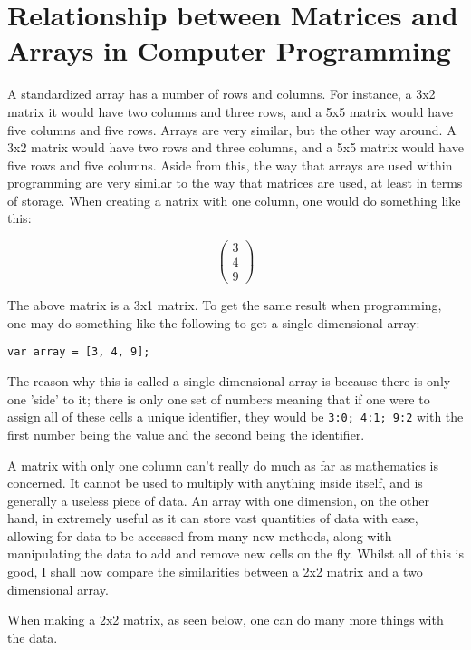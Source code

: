 \documentclass[a4paper,10pt]{article}
\begin{document}
    \newpage

    \section{Relationship between Matrices and Arrays in Computer Programming}
      A standardized array has a number of rows and columns. For instance, a 3x2 matrix it would have two columns and three rows, and a 5x5 matrix would have five columns and five rows. Arrays are very similar, but the other way around. A 3x2 matrix would have two rows and three columns, and a 5x5 matrix would have five rows and five columns. Aside from this, the way that arrays are used within programming are very similar to the way that matrices are used, at least in terms of storage. When creating a natrix with one column, one would do something like this:

      \begin{equation*}
        \begin{pmatrix}
          3\\
          4\\
          9
        \end{pmatrix}
      \end{equation*}

      The above matrix is a 3x1 matrix. To get the same result when programming, one may do something like the following to get a single dimensional array:

      \texttt{var array = [3, 4, 9];}

      The reason why this is called a single dimensional array is because there is only one 'side' to it; there is only one set of numbers meaning that if one were to assign all of these cells a unique identifier, they would be \texttt{3:0; 4:1; 9:2} with the first number being the value and the second being the identifier.

      A matrix with only one column can't really do much as far as mathematics is concerned. It cannot be used to multiply with anything inside itself, and is generally a useless piece of data. An array with one dimension, on the other hand, in extremely useful as it can store vast quantities of data with ease, allowing for data to be accessed from many new methods, along with manipulating the data to add and remove new cells on the fly. Whilst all of this is good, I shall now compare the similarities between a 2x2 matrix and a two dimensional array.

      When making a 2x2 matrix, as seen below, one can do many more things with the data.
\end{document}
